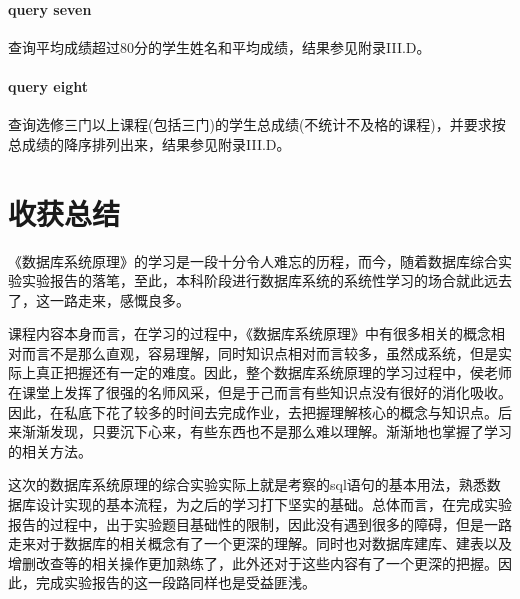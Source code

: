 \documentclass[UTF8]{ctexart}
\begin{document}
    \paragraph{query seven}
    查询平均成绩超过80分的学生姓名和平均成绩，结果参见附录III.D。


    \paragraph{query eight}
    查询选修三门以上课程(包括三门)的学生总成绩(不统计不及格的课程)，并要求按总成绩的降序排列出来，结果参见附录III.D。



    \section{收获总结}
    《数据库系统原理》的学习是一段十分令人难忘的历程，而今，随着数据库综合实验实验报告的落笔，至此，本科阶段进行数据库系统的系统性学习的场合就此远去了，这一路走来，感慨良多。

    课程内容本身而言，在学习的过程中，《数据库系统原理》中有很多相关的概念相对而言不是那么直观，容易理解，同时知识点相对而言较多，虽然成系统，但是实际上真正把握还有一定的难度。因此，整个数据库系统原理的学习过程中，侯老师在课堂上发挥了很强的名师风采，但是于己而言有些知识点没有很好的消化吸收。因此，在私底下花了较多的时间去完成作业，去把握理解核心的概念与知识点。后来渐渐发现，只要沉下心来，有些东西也不是那么难以理解。渐渐地也掌握了学习的相关方法。

    这次的数据库系统原理的综合实验实际上就是考察的sql语句的基本用法，熟悉数据库设计实现的基本流程，为之后的学习打下坚实的基础。总体而言，在完成实验报告的过程中，出于实验题目基础性的限制，因此没有遇到很多的障碍，但是一路走来对于数据库的相关概念有了一个更深的理解。同时也对数据库建库、建表以及增删改查等的相关操作更加熟练了，此外还对于这些内容有了一个更深的把握。因此，完成实验报告的这一段路同样也是受益匪浅。
\end{document}
